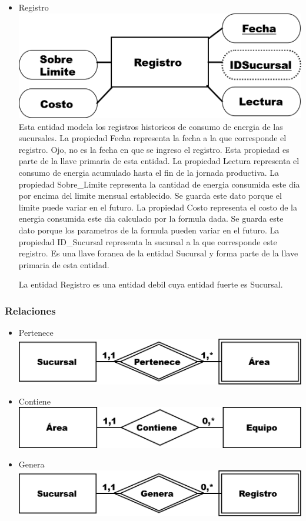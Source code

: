 \documentclass{article}
\begin{document}
\begin{itemize}
\item Registro
\includegraphics[scale=0.25]{Imagenes/Informe1/EntidadRegistro.png}
Esta entidad modela los registros historicos de consumo de energia de las sucursales.
La propiedad Fecha representa la fecha a la que corresponde el registro. Ojo, no es la fecha en que se ingreso el registro. Esta propiedad es parte de la llave primaria de esta entidad.
La propiedad Lectura representa el consumo de energia acumulado hasta el fin de la jornada productiva.
La propiedad Sobre\_Limite representa la cantidad de energia consumida este dia por encima del limite mensual establecido. Se guarda este dato porque el limite puede variar en el futuro.
La propiedad Costo representa el costo de la energia consumida este dia calculado por la formula dada. Se guarda este dato porque los parametros de la formula pueden variar en el futuro.
La propiedad ID\_Sucursal representa la sucursal a la que corresponde este registro. Es una llave foranea de la entidad Sucursal y forma parte de la llave primaria de esta entidad.

La entidad Registro es una entidad debil cuya entidad fuerte es Sucursal.
\end{itemize}

\subsubsection{Relaciones}
\begin{itemize}
\item Pertenece
\includegraphics[scale=0.25]{Imagenes/Informe1/RelacionPertenece.png}
\item Contiene
\includegraphics[scale=0.25]{Imagenes/Informe1/RelacionContiene.png}
\item Genera
\includegraphics[scale=0.25]{Imagenes/Informe1/RelacionGenera.png}
\end{itemize}
\end{document}
